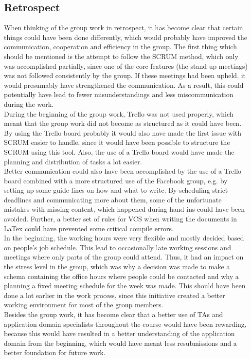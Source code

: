 \subsection{Retrospect}
When thinking of the group work in retrospect, it has become clear that certain things could have been done differently, which would probably have improved the communication, cooperation and efficiency in the group.
The first thing which should be mentioned is the attempt to follow the SCRUM method, which only was accomplished partially, since one of the core features (the stand up meetings) was not followed consistently by the group. If these meetings had been upheld, it would presumably have strengthened the communication. As a result, this could potentially have lead to fewer misunderstandings and less miscommunication during the work.
\\
During the beginning of the group work, Trello was not used properly, which meant that the group work did not become as structured as it could have been. By using the Trello board probably it would also have made the first issue with SCRUM easier to handle, since it would have been possible to structure the SCRUM using this tool. Also, the use of a Trello board would have made the planning and distribution of tasks a lot easier.
\\
Better communication could also have been accomplished by the use of a Trello board combined with a more structured use of the Facebook group, e.g. by setting up some guide lines on how and what to write. By scheduling strict deadlines and communicating more about them, some of the unfortunate mistakes with missing content, which happened during hand ins could have been avoided. Further, a better set of rules for VCS when writing the documents in LaTex could have prevented some critical compile errors.
\\
In the beginning, the working hours were very flexible and mostly decided based on people's job schedule. This lead to occasionally late working sessions and meetings where only parts of the group could attend. Thus, it had an impact on the stress level in the group, which was why a decision was made to make a schema containing the office hours where people could be contacted and why a planning a fixed meeting schedule for the week was made. This should have been done a lot earlier in the work process, since this initiative created a better working environment for most of the group members.
\\
Besides the group work, it has become clear that a better use of TAs and application domain specialists throughout the course would have been rewarding, because this would have resulted in a better understanding of the application domain from the beginning, which would have meant less resubmissions and a better foundation for future work. 

